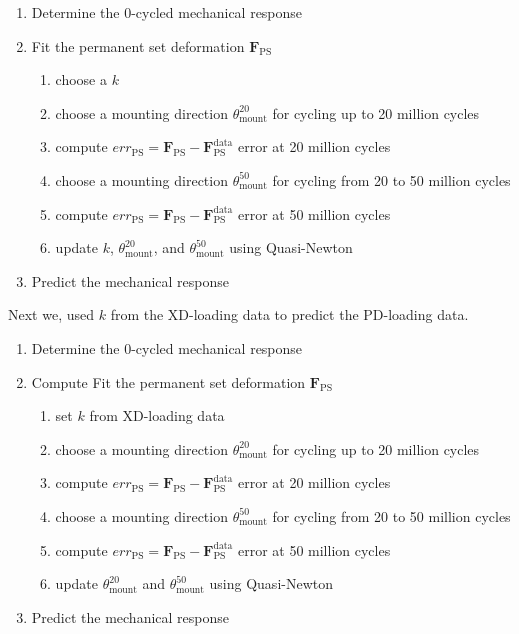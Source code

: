 \begin{enumerate}
\item Determine the 0-cycled mechanical response
\item Fit the permanent set deformation $\mathbf{F}_\mathrm{PS}$ 
	\begin{enumerate}
	\item choose a $k $
	\item choose a mounting direction $\theta_\mathrm{mount}^{20}$ for cycling up to 20 million cycles 
	\item compute $err_\mathrm{PS} = \mathbf{F}_\mathrm{PS} - \mathbf{F}_\mathrm{PS}^\mathrm{data}$ error at 20 million cycles
	\item choose a mounting direction $\theta_\mathrm{mount}^{50}$ for cycling from 20 to 50 million cycles 
	\item compute $err_\mathrm{PS} = \mathbf{F}_\mathrm{PS} - \mathbf{F}_\mathrm{PS}^\mathrm{data}$ error at 50 million cycles
	\item update $k$, $\theta_\mathrm{mount}^{20}$, and $\theta_\mathrm{mount}^{50}$ using Quasi-Newton
	\end{enumerate}
\item Predict the mechanical response 
\end{enumerate}
Next we, used $k $ from the XD-loading data to predict the PD-loading data. 
\begin{enumerate}
\item Determine the 0-cycled mechanical response
\item Compute Fit the permanent set deformation $\mathbf{F}_\mathrm{PS}$
	\begin{enumerate}
	\item set $k $ from XD-loading data
	\item choose a mounting direction $\theta_\mathrm{mount}^{20}$ for cycling up to 20 million cycles 
	\item compute $err_\mathrm{PS} = \mathbf{F}_\mathrm{PS} - \mathbf{F}_\mathrm{PS}^\mathrm{data}$ error at 20 million cycles
	\item choose a mounting direction $\theta_\mathrm{mount}^{50}$ for cycling from 20 to 50 million cycles 
	\item compute $err_\mathrm{PS} = \mathbf{F}_\mathrm{PS} - \mathbf{F}_\mathrm{PS}^\mathrm{data}$ error at 50 million cycles
	\item update $\theta_\mathrm{mount}^{20}$ and $\theta_\mathrm{mount}^{50}$ using Quasi-Newton
	\end{enumerate}
\item Predict the mechanical response 
\end{enumerate}

